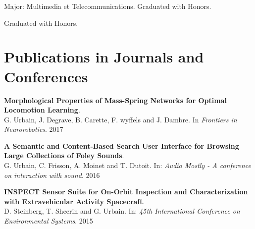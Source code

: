 \documentclass[a4paper]{deedy-resume} %
\begin{document}
\vspace{10pt}

\vspace{2pt}
Major: Multimedia et Telecommunications.
Graduated with Honors.

\vspace{3pt}
Graduated with Honors.

\vspace{15pt}

\begin{minipage}[b]{0.72\linewidth}
	
	\section{Publications in Journals and Conferences}
	
	\textbf{Morphological Properties of Mass-Spring Networks for Optimal Locomotion Learning}. \\
	G. Urbain, J. Degrave, B. Carette, F. wyffels and J. Dambre. In \textit{Frontiers in Neurorobotics}. 2017
	
	\vspace{5pt}
	\textbf{A Semantic and Content-Based Search User Interface for Browsing Large Collections of Foley Sounds}. \\
	G. Urbain, C. Frisson, A. Moinet and T. Dutoit. In: \textit{Audio Mostly - A conference on interaction with sound}. 2016
	
	\vspace{5pt}
	\textbf{INSPECT Sensor Suite for On-Orbit Inspection and Characterization with Extravehicular Activity Spacecraft}.\\
	D. Steinberg, T. Sheerin and G. Urbain. In: \textit{45th International Conference on Environmental Systems}. 2015
	
\end{minipage}
\hfill
\end{document}
